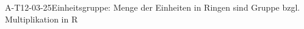 
\begin{PROP}{A-T12-03-25}{Einheitsgruppe: Menge der Einheiten in Ringen sind Gruppe bzgl. Multiplikation in R}
\end{PROP}
